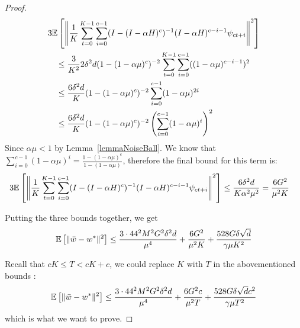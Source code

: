 \begin{proof}
\begin{align*}
    & 3\mathbb{E}\left[ \left\|\frac{1}{K}\sum_{t=0}^{K-1}\sum_{i=0}^{c-1}(I - (I - \alpha H)^c)^{-1} (I - \alpha H )^{c-i-1} \psi_{ct+i}\right\|^2 \right] \\
    & \quad \leq 
    \frac{3}{K^2} 2 \delta^2 d (1-(1-\alpha\mu)^c)^{-2} \sum_{t=0}^{K-1}\sum_{i=0}^{c-1} ((1-\alpha\mu)^{c-i-1})^2 \\
    & \quad \leq 
    \frac{6 \delta^2 d}{K}  (1-(1-\alpha\mu)^c)^{-2} \sum_{i=0}^{c-1} (1-\alpha\mu)^{2i} \\
    & \quad \leq 
    \frac{6 \delta^2 d}{K}  (1-(1-\alpha\mu)^c)^{-2} \left(\sum_{i=0}^{c-1} (1-\alpha\mu)^{i}\right)^2 
\end{align*}
Since $\alpha\mu < 1$ by Lemma~\ref{lemmaNoiseBall}. We know that $\sum_{i=0}^{c-1} (1-\alpha\mu)^i = \frac{1-(1-\alpha\mu)^c}{1-(1-\alpha\mu)}$, therefore the final bound for this term is:
\begin{align*}
    & 3\mathbb{E}\left[ \left\|\frac{1}{K}\sum_{t=0}^{K-1}\sum_{i=0}^{c-1}(I - (I - \alpha H)^c)^{-1} (I - \alpha H )^{c-i-1} \psi_{ct+i}\right\|^2 \right]  \leq \frac{6 \delta^2 d}{K\alpha^2\mu^2} = \frac{6G^2}{\mu^2K}
\end{align*}

Putting the three bounds together, we get
\begin{align*}
    \mathbb{E}\left[ \|\bar{w} - w^*\|^2 \right] \leq\frac{3\cdot 44^2 M^2 G^2 \delta^2 d}{\mu^4} + \frac{6G^2}{\mu^2K}+ \frac{528 G \delta \sqrt{d}}{\gamma \mu K^2} 
\end{align*}

Recall that $cK \leq T < cK+c$, we could replace $K$ with $T$ in the abovementioned bounds :
\begin{align*}
    \mathbb{E}\left[ \|\bar{w} - w^*\|^2 \right] \leq\frac{3\cdot 44^2 M^2 G^2 \delta^2 d}{\mu^4} + \frac{6G^2c}{\mu^2T}+ \frac{528 G \delta \sqrt{d}c^2}{\gamma \mu T^2} 
\end{align*}
which is what we want to prove.

\end{proof}

